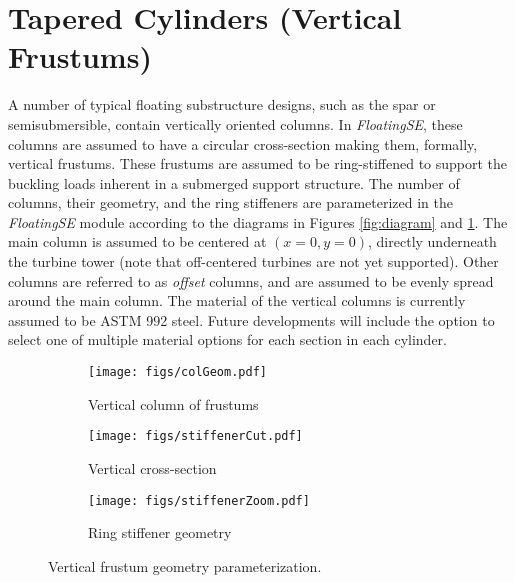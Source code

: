 \section{Tapered Cylinders (Vertical Frustums)}
A number of typical floating substructure designs, such as the spar or
semisubmersible, contain vertically oriented columns.  In
\textit{FloatingSE}, these columns are
assumed to have a circular cross-section making them, formally, vertical
frustums.  These frustums are assumed to be ring-stiffened to support
the buckling loads inherent in a submerged support structure.  The
number of columns, their geometry, and the ring stiffeners are
parameterized in the \textit{FloatingSE} module according to the
diagrams in Figures \ref{fig:diagram} and \ref{fig:column}.  The main
column is assumed to be centered at $(x=0, y=0)$, directly underneath the
turbine tower (note that off-centered turbines are not yet supported).
Other columns are referred to as \textit{offset} columns, and are
assumed to be evenly spread around the main column.  The material of the
vertical columns is currently assumed to be ASTM 992 steel.
Future developments will include the option to select one of multiple
material options for each section in each cylinder.

\begin{figure}[htb]
  \begin{subfigure}[b]{0.38\linewidth}
    \centering \texttt{[image: figs/colGeom.pdf]}
    \caption{Vertical column of frustums}
  \end{subfigure}
  \begin{subfigure}[b]{0.29\linewidth}
    \centering \texttt{[image: figs/stiffenerCut.pdf]}
    \caption{Vertical cross-section}
  \end{subfigure}
  \begin{subfigure}[b]{0.29\linewidth}
    \centering \texttt{[image: figs/stiffenerZoom.pdf]}
    \caption{Ring stiffener geometry}
  \end{subfigure}
  \caption{Vertical frustum geometry parameterization.}
  \label{fig:column}
\end{figure}

